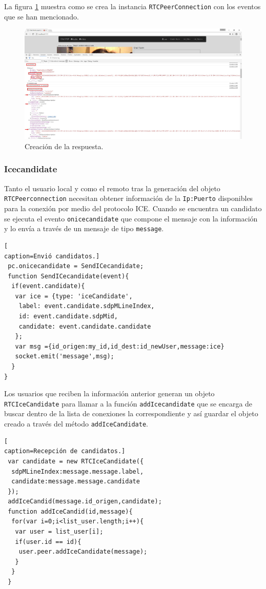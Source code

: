 La figura \ref{fig:AnswerCliente} muestra como se crea la instancia \texttt{RTCPeerConnection} con los eventos que se han mencionado.
\begin{figure}[!h]
\centering
\includegraphics[width=1\linewidth]{Figures/AnswerCliente}
\decoRule
\caption[Creación de la respuesta.]{Creación de la respuesta.}
\label{fig:AnswerCliente}
\end{figure}

\subsubsection*{Icecandidate}
Tanto el usuario local y como el remoto tras la generación del objeto \texttt{RTCPeerconnection} necesitan obtener información de la \texttt{Ip:Puerto} disponibles para la conexión por medio del protocolo ICE. Cuando se encuentra un candidato se ejecuta el evento \texttt{onicecandidate} que compone el mensaje con la información y lo envía a través de un mensaje de tipo \texttt{message}.
\begin{lstlisting}[
caption=Envió candidatos.]
 pc.onicecandidate = SendICecandidate;
 function SendICecandidate(event){
  if(event.candidate){
   var ice = {type: 'iceCandidate',
    label: event.candidate.sdpMLineIndex,
    id: event.candidate.sdpMid,
    candidate: event.candidate.candidate
   };
   var msg ={id_origen:my_id,id_dest:id_newUser,message:ice}
   socket.emit('message',msg);
  }
}
\end{lstlisting}

Los usuarios que reciben la información anterior generan un objeto \texttt{RTCIceCandidate} para llamar a la función \texttt{addIcecandidate} que se encarga de buscar dentro de la lista de conexiones la correspondiente y así guardar el objeto creado a través del método \texttt{addIceCandidate}.
\begin{lstlisting}[
caption=Recepción de candidatos.]
 var candidate = new RTCIceCandidate({
  sdpMLineIndex:message.message.label,
  candidate:message.message.candidate
 });
 addIceCandid(message.id_origen,candidate);
 function addIceCandid(id,message){
  for(var i=0;i<list_user.length;i++){
   var user = list_user[i];
   if(user.id == id){
    user.peer.addIceCandidate(message);
   }
  }
 }
\end{lstlisting}

